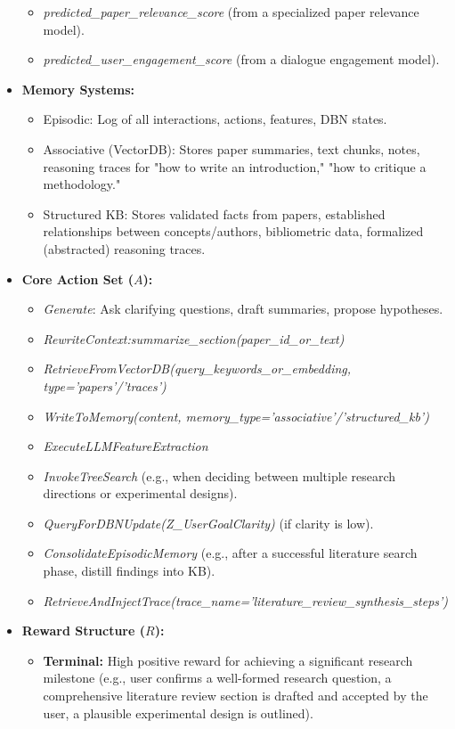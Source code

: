 \documentclass[11pt]{article}
\begin{document}
\begin{itemize}
\begin{itemize}
        \item \emph{predicted_paper_relevance_score} (from a specialized paper relevance model).
        \item \emph{predicted_user_engagement_score} (from a dialogue engagement model).
    \end{itemize}
    \item \textbf{Memory Systems:}
    \begin{itemize}
        \item Episodic: Log of all interactions, actions, features, DBN states.
        \item Associative (VectorDB): Stores paper summaries, text chunks, notes, reasoning traces for "how to write an introduction," "how to critique a methodology."
        \item Structured KB: Stores validated facts from papers, established relationships between concepts/authors, bibliometric data, formalized (abstracted) reasoning traces.
    \end{itemize}
    \item \textbf{Core Action Set ($A$):}
    \begin{itemize}
        \item \emph{Generate}: Ask clarifying questions, draft summaries, propose hypotheses.
        \item \emph{RewriteContext:summarize_section(paper_id_or_text)}
        \item \emph{RetrieveFromVectorDB(query_keywords_or_embedding, type='papers'/'traces')}
        \item \emph{WriteToMemory(content, memory_type='associative'/'structured_kb')}
        \item \emph{ExecuteLLMFeatureExtraction}
        \item \emph{InvokeTreeSearch} (e.g., when deciding between multiple research directions or experimental designs).
        \item \emph{QueryForDBNUpdate(Z_{UserGoalClarity})} (if clarity is low).
        \item \emph{ConsolidateEpisodicMemory} (e.g., after a successful literature search phase, distill findings into KB).
        \item \emph{RetrieveAndInjectTrace(trace_name='literature_review_synthesis_steps')}
    \end{itemize}
    \item \textbf{Reward Structure ($R$):}
    \begin{itemize}
        \item \textbf{Terminal:} High positive reward for achieving a significant research milestone (e.g., user confirms a well-formed research question, a comprehensive literature review section is drafted and accepted by the user, a plausible experimental design is outlined).

\end{itemize}
\end{itemize}
\end{document}
